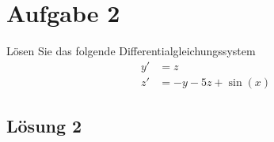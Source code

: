 \documentclass[main.tex]{subfiles}
\begin{document}
\section{Aufgabe 2}
Lösen Sie das folgende Differentialgleichungssystem
\begin{align*}
    y' &= z \\
    z' &= -y - 5z + \sin(x)
\end{align*}

\subsection{Lösung 2}
\end{document}
